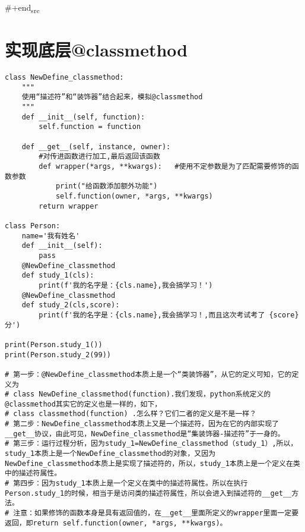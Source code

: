 \documentclass[11pt]{article}
\begin{document}
\subsubsection{}
\label{sec:orgd9b5d29}
\#+end\textsubscript{src}
\section{实现底层@classmethod}
\label{sec:org54cf621}
\begin{verbatim}
class NewDefine_classmethod:
    """
    使用“描述符”和“装饰器”结合起来，模拟@classmethod
    """
    def __init__(self, function):
        self.function = function

    def __get__(self, instance, owner):
        #对传进函数进行加工,最后返回该函数
        def wrapper(*args, **kwargs):   #使用不定参数是为了匹配需要修饰的函数参数
            print("给函数添加额外功能")
            self.function(owner, *args, **kwargs)
        return wrapper

class Person:
    name='我有姓名'
    def __init__(self):
        pass
    @NewDefine_classmethod
    def study_1(cls):
        print(f'我的名字是：{cls.name},我会搞学习！')
    @NewDefine_classmethod
    def study_2(cls,score):
        print(f'我的名字是：{cls.name},我会搞学习！,而且这次考试考了 {score} 分')

print(Person.study_1())
print(Person.study_2(99))

# 第一步：@NewDefine_classmethod本质上是一个“类装饰器”，从它的定义可知，它的定义为
# class NewDefine_classmethod(function).我们发现，python系统定义的@classmethod其实它的定义也是一样的，如下，
# class classmethod(function) .怎么样？它们二者的定义是不是一样？
# 第二步：NewDefine_classmethod本质上又是一个描述符，因为在它的内部实现了__get__协议，由此可见，NewDefine_classmethod是“集装饰器-描述符”于一身的。
# 第三步：运行过程分析，因为study_1=NewDefine_classmethod（study_1）,所以，study_1本质上是一个NewDefine_classmethod的对象，又因为NewDefine_classmethod本质上是实现了描述符的，所以，study_1本质上是一个定义在类中的描述符属性。
# 第四步：因为study_1本质上是一个定义在类中的描述符属性。所以在执行Person.study_1的时候，相当于是访问类的描述符属性，所以会进入到描述符的__get__方法。
# 注意：如果修饰的函数本身是具有返回值的，在__get__里面所定义的wrapper里面一定要返回，即return self.function(owner, *args, **kwargs)。
\end{verbatim}
\end{document}
